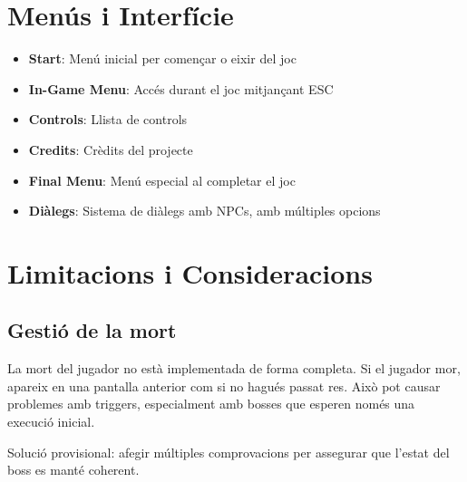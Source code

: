 \documentclass[a4paper,12pt]{article}
\begin{document}
\section{Menús i Interfície}

\begin{itemize}
    \item \textbf{Start}: Menú inicial per començar o eixir del joc
    \item \textbf{In-Game Menu}: Accés durant el joc mitjançant ESC
    \item \textbf{Controls}: Llista de controls
    \item \textbf{Credits}: Crèdits del projecte
    \item \textbf{Final Menu}: Menú especial al completar el joc
    \item \textbf{Diàlegs}: Sistema de diàlegs amb NPCs, amb múltiples opcions
\end{itemize}

\section{Limitacions i Consideracions}

\subsection{Gestió de la mort}
La mort del jugador no està implementada de forma completa. Si el jugador mor, apareix en una pantalla anterior com si no hagués passat res. Això pot causar problemes amb triggers, especialment amb bosses que esperen només una execució inicial.

Solució provisional: afegir múltiples comprovacions per assegurar que l'estat del boss es manté coherent.
\end{document}

